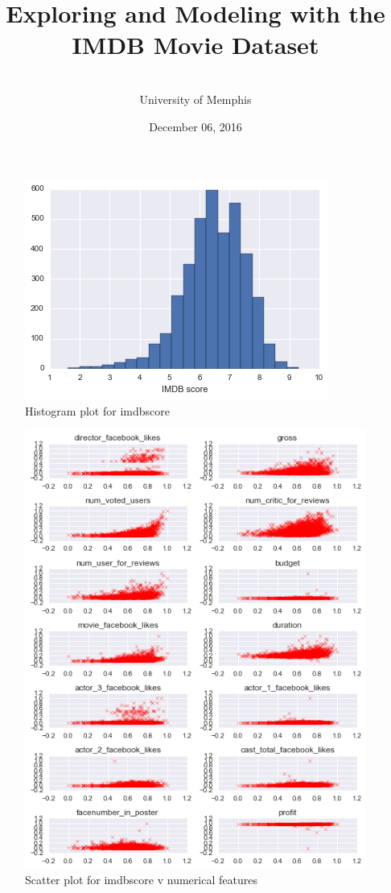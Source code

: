 \documentclass{article}%
\begin{document}
\title{Exploring and Modeling with the IMDB Movie Dataset}
\author{
\\University of Memphis}
\date{December 06, 2016}
\maketitle

\begin{figure}
\centering
\includegraphics[width=1.0\columnwidth]{Fig/imdbhist.png}
\caption{Histogram plot for imdbscore}
\label{fig:imdbhist}
\end{figure}

\begin{figure}
\centering
\includegraphics[width=1.0\columnwidth]{Fig/ScatterPlot.png}
\caption{Scatter plot for imdbscore v numerical features}
\label{fig:scatter}
\end{figure}
\end{document}
